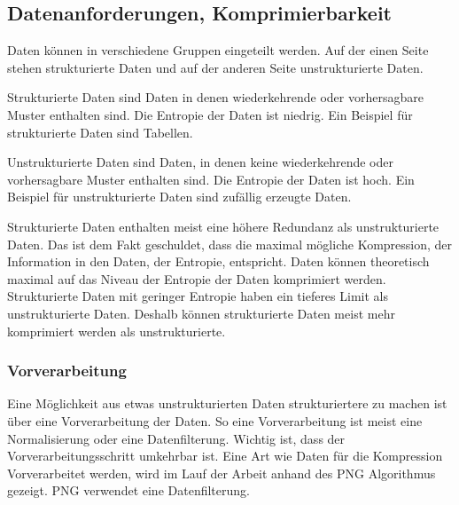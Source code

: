 \documentclass[conference]{IEEEtran}
\begin{document}

\subsection{Datenanforderungen, Komprimierbarkeit}

Daten können in verschiedene Gruppen eingeteilt werden.
Auf der einen Seite stehen strukturierte Daten und auf der anderen Seite
unstrukturierte Daten.

Strukturierte Daten sind Daten in denen wiederkehrende oder vorhersagbare Muster
enthalten sind.
Die Entropie der Daten ist niedrig.
Ein Beispiel für strukturierte Daten sind Tabellen.

Unstrukturierte Daten sind Daten, in denen keine wiederkehrende oder vorhersagbare
Muster enthalten sind.
Die Entropie der Daten ist hoch.
Ein Beispiel für unstrukturierte Daten sind zufällig erzeugte Daten.

Strukturierte Daten enthalten meist eine höhere Redundanz als unstrukturierte
Daten.
Das ist dem Fakt geschuldet, dass die maximal mögliche Kompression, der Information in den
Daten, der Entropie, entspricht.
Daten können theoretisch maximal auf das Niveau der Entropie der Daten komprimiert werden.
Strukturierte Daten mit geringer Entropie haben ein tieferes Limit als unstrukturierte Daten.
Deshalb können strukturierte Daten meist mehr komprimiert werden als unstrukturierte.

\subsubsection{Vorverarbeitung}

Eine Möglichkeit aus etwas unstrukturierten Daten strukturiertere zu machen ist über
eine Vorverarbeitung der Daten.
So eine Vorverarbeitung ist meist eine Normalisierung oder eine Datenfilterung.
Wichtig ist, dass der Vorverarbeitungsschritt umkehrbar ist.
Eine Art wie Daten für die Kompression Vorverarbeitet werden, wird im Lauf der
Arbeit anhand des PNG Algorithmus gezeigt.
PNG verwendet eine Datenfilterung.
\end{document}
